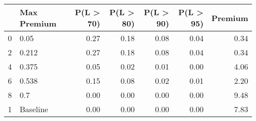\begin{tabular}{llrrrrr}
\toprule
{} & Max Premium &  P(L > 70) &  P(L > 80) &  P(L > 90) &  P(L > 95) &  Premium \\
\midrule
0 &        0.05 &       0.27 &       0.18 &       0.08 &       0.04 &     0.34 \\
2 &       0.212 &       0.27 &       0.18 &       0.08 &       0.04 &     0.34 \\
4 &       0.375 &       0.05 &       0.02 &       0.01 &       0.00 &     4.06 \\
6 &       0.538 &       0.15 &       0.08 &       0.02 &       0.01 &     2.20 \\
8 &         0.7 &       0.00 &       0.00 &       0.00 &       0.00 &     9.48 \\
1 &    Baseline &       0.00 &       0.00 &       0.00 &       0.00 &     7.83 \\
\bottomrule
\end{tabular}
